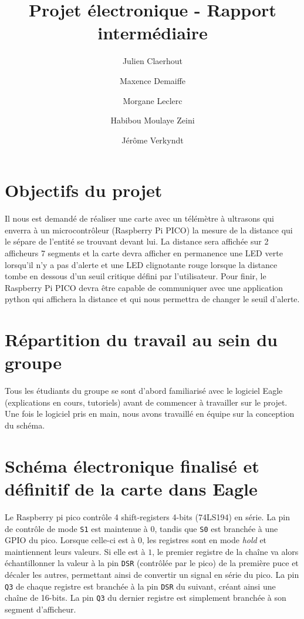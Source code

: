 \documentclass[a4paper,12pt]{scrartcl}
\title{Projet électronique - Rapport intermédiaire}
\author{
  Julien Claerhout
  \and Maxence Demaiffe
  \and Morgane Leclerc
  \and Habibou Moulaye Zeini
  \and Jérôme Verkyndt
}
\begin{document}
\maketitle

\section{Objectifs du projet}

Il nous est demandé de réaliser une carte avec un télémètre à ultrasons qui
enverra à un microcontrôleur (Raspberry Pi PICO) la mesure de la distance qui
le sépare de l’entité se trouvant devant lui. La distance sera affichée sur 2
afficheurs 7 segments et la carte devra afficher en permanence une LED verte
lorsqu’il n’y a pas d’alerte et une LED clignotante rouge lorsque la distance
tombe en dessous d’un seuil critique défini par l’utilisateur. Pour finir, le
Raspberry Pi PICO devra être capable de communiquer avec une application python
qui affichera la distance et qui nous permettra de changer le seuil d’alerte.

\section{R\'epartition du travail au sein du groupe}

Tous les étudiants du groupe se sont d’abord familiarisé avec le logiciel
Eagle (explications en cours, tutoriels) avant de commencer à travailler sur le
projet. Une fois le logiciel pris en main, nous avons travaillé en équipe sur
la conception du schéma.

\section{
  Sch\'ema \'electronique finalis\'e et d\'efinitif de la carte dans Eagle
}

Le Raspberry pi pico contrôle 4 shift-registers 4-bits (\textsc{74LS194}) en
série. La pin de contrôle de mode \texttt{S1} est maintenue à $0$, tandis que
\texttt{S0} est branchée à une GPIO du pico. Lorsque celle-ci est à $0$, les
registres sont en mode \textit{hold} et maintiennent leurs valeurs. Si elle
est à $1$, le premier registre de la chaîne va alors échantillonner la valeur
à la pin \texttt{DSR} (contrôlée par le pico) de la première puce et décaler
les autres, permettant ainsi de convertir un signal en série du pico. La pin
\texttt{Q3} de chaque registre est branchée à la pin \texttt{DSR} du suivant,
créant ainsi une chaîne de 16-bits. La pin \texttt{Q3} du dernier registre est
simplement branchée à son segment d'afficheur.
\end{document}
